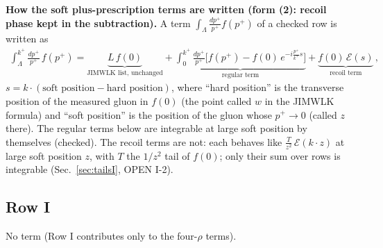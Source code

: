 \documentclass[9pt]{article}
\numberwithin{equation}{section}
\begin{document}
\noindent\textbf{How the soft plus-prescription terms are written (form (2): recoil phase kept in the subtraction).} A term $\int_{\Lambda}\frac{dp^{+}}{p^{+}}f(p^{+})$ of a checked row is written as
\begin{align}
\int_{\Lambda}^{k^{+}}\frac{dp^{+}}{p^{+}}\,f(p^{+})=\underbrace{L\,f(0)}_{\text{JIMWLK list, unchanged}}+\underbrace{\int_{0}^{k^{+}}\frac{dp^{+}}{p^{+}}\Big[f(p^{+})-f(0)\,e^{-i\frac{p^{+}}{k^{+}}s}\Big]}_{\text{regular term}}+\underbrace{f(0)\,\mathcal{E}(s)}_{\text{recoil term}}\,,\label{eq:form2}
\end{align}
$s=k\cdot(\text{soft position}-\text{hard position})$, where ``hard position'' is the transverse position of the measured gluon in $f(0)$ (the point called $w$ in the JIMWLK formula) and ``soft position'' is the position of the gluon whose $p^{+}\to0$ (called $z$ there). The regular terms below are integrable at large soft position by themselves (checked). The recoil terms are not: each behaves like $\frac{T}{z^{2}}\,\mathcal{E}(k\cdot z)$ at large soft position $z$, with $T$ the $1/z^{2}$ tail of $f(0)$; only their sum over rows is integrable (Sec.~\ref{sec:tailsI}, {\color{magenta}OPEN I-2}).

\subsection{Row I}
\noindent No term (Row I contributes only to the four-$\rho$ terms).
\end{document}
